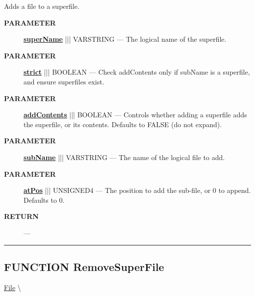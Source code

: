 \par





Adds a file to a superfile.






\par
\begin{description}
\item [\colorbox{tagtype}{\color{white} \textbf{\textsf{PARAMETER}}}] \textbf{\underline{superName}} ||| VARSTRING --- The logical name of the superfile.
\item [\colorbox{tagtype}{\color{white} \textbf{\textsf{PARAMETER}}}] \textbf{\underline{strict}} ||| BOOLEAN --- Check addContents only if subName is a superfile, and ensure superfiles exist.
\item [\colorbox{tagtype}{\color{white} \textbf{\textsf{PARAMETER}}}] \textbf{\underline{addContents}} ||| BOOLEAN --- Controls whether adding a superfile adds the superfile, or its contents. Defaults to FALSE (do not expand).
\item [\colorbox{tagtype}{\color{white} \textbf{\textsf{PARAMETER}}}] \textbf{\underline{subName}} ||| VARSTRING --- The name of the logical file to add.
\item [\colorbox{tagtype}{\color{white} \textbf{\textsf{PARAMETER}}}] \textbf{\underline{atPos}} ||| UNSIGNED4 --- The position to add the sub-file, or 0 to append. Defaults to 0.
\end{description}







\par
\begin{description}
\item [\colorbox{tagtype}{\color{white} \textbf{\textsf{RETURN}}}] \textbf{} --- 
\end{description}




\rule{\linewidth}{0.5pt}
\subsection*{\textsf{\colorbox{headtoc}{\color{white} FUNCTION}
RemoveSuperFile}}

\hypertarget{ecldoc:file.removesuperfile}{}
\hspace{0pt} \hyperlink{ecldoc:File}{File} \textbackslash 

